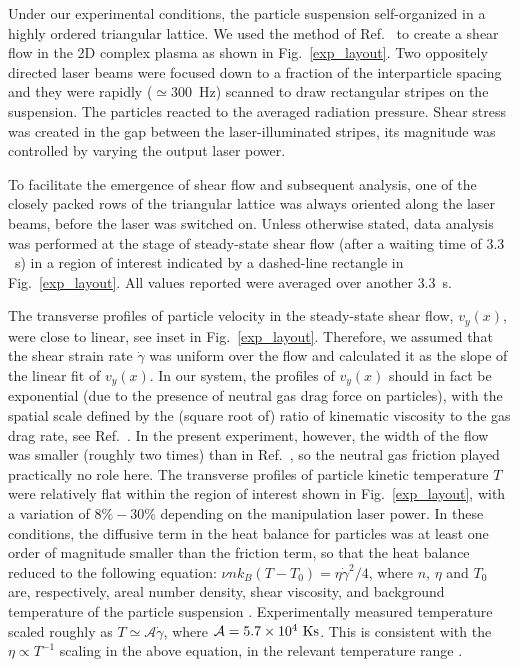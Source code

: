 \documentclass[aps,prl,twocolumn,showpacs,groupedaddress,amssymb]{revtex4}
\begin{document}
Under our experimental conditions, the particle suspension self-organized in a highly ordered triangular lattice. We used the method of Ref.~\cite{Nosenko:04PRL_visc} to create a shear flow in the 2D complex plasma as shown in Fig.~\ref{exp_layout}. Two oppositely directed laser beams were focused down to a fraction of the interparticle spacing and they were rapidly ($\simeq 300$~Hz) scanned to draw rectangular stripes on the suspension. The particles reacted to the averaged radiation pressure. Shear stress was created in the gap between the laser-illuminated stripes, its magnitude was controlled by varying the output laser power.

To facilitate the emergence of shear flow and subsequent analysis, one of the closely packed rows of the triangular lattice was always oriented along the laser beams, before the laser was switched on. Unless otherwise stated, data analysis was performed at the stage of steady-state shear flow (after a waiting time of $3.3$~s) in a region of interest indicated by a dashed-line rectangle in Fig.~\ref{exp_layout}. All values reported were averaged over another $3.3$~s.

The transverse profiles of particle velocity in the steady-state shear flow, $v_y(x)$, were close to linear, see inset in Fig.~\ref{exp_layout}. Therefore, we assumed that the shear strain rate $\dot{\gamma}$ was uniform over the flow and calculated it as the slope of the linear fit of $v_y(x)$. In our system, the profiles of $v_y(x)$ should in fact be exponential (due to the presence of neutral gas drag force on particles), with the spatial scale defined by the (square root of) ratio of kinematic viscosity to the gas drag rate, see Ref.~\cite{Nosenko:04PRL_visc}. In the present experiment, however, the width of the flow was smaller (roughly two times) than in Ref.~\cite{Nosenko:04PRL_visc}, so the neutral gas friction played practically no role here. The transverse profiles of particle kinetic temperature $T$ were relatively flat within the region of interest shown in Fig.~\ref{exp_layout}, with a variation of $8\%-30\%$ depending on the manipulation laser power. In these conditions, the diffusive term in the heat balance for particles was at least one order of magnitude smaller than the friction term, so that the heat balance reduced to the following equation: $\nu nk_B(T-T_0)=\eta\dot{\gamma}^2/4$, where $n$, $\eta$ and $T_0$ are, respectively, areal number density, shear viscosity, and background temperature of the particle suspension \cite{Nosenko:PRL08}. Experimentally measured temperature scaled roughly as $T\simeq\mathcal{A}\dot{\gamma}$, where $\mathcal{A}=5.7\times10^4~{\rm Ks}$. This is consistent with the $\eta\propto T^{-1}$ scaling in the above equation, in the relevant temperature range \cite{Hamaguchi:02}.
\end{document}

